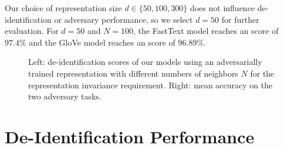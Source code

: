 %
Our choice of representation size $d \in \{50, 100, 300\}$ does not influence de-identifi\-ca\-tion or adversary performance, so we select $d=50$ for further evaluation.
%
For $d=50$ and $N=100$, the FastText model reaches an \fone score of $97.4\%$ and the GloVe model reaches an \fone score of $96.89\%$.

\begin{figure*}
    \centering
    
    \caption[De-identification with adversarially learned representations]{%
        Left: de-identification \fone scores of our models using an adversarially trained representation with different numbers of neighbors $N$ for the representation invariance requirement.
        Right: mean accuracy on the two adversary tasks.
    }\label{fig:adversarial-deid}
\end{figure*}

\section{De-Identification Performance}

